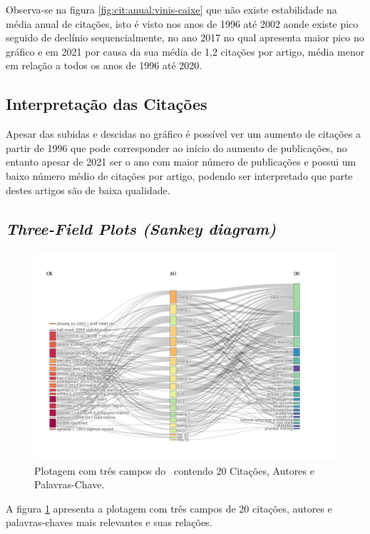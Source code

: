 Observa-se na figura \ref{fig:cit:anual:vinis-caixe} que não existe estabilidade na média anual de citações, isto é visto nos anos de 1996 até 2002 aonde existe pico seguido de declínio sequencialmente, no ano 2017 no qual apresenta maior pico no gráfico e em 2021 por causa da sua média de 1,2 citações por artigo, média menor em relação a todos os anos de 1996 até 2020.

\subsection{Interpretação das Citações}

Apesar das subidas e descidas no gráfico é possível ver um aumento de citações a partir de 1996 que pode corresponder ao início do aumento de publicações, no entanto apesar de 2021 ser o ano com maior número de publicações e possui um baixo número médio de citações por artigo, podendo ser interpretado que parte destes artigos são de baixa qualidade.

\subsection{\textit{Three-Field Plots (Sankey diagram)}}

\begin{figure}
    \centering
    \includegraphics[width=1\textwidth]{experiments/vinis-caixe/PesqBibliogr/MineracaoDados/WoS-20220204/Dataset/ThreeFieldPlot-2022-02-09.png}
    \caption{Plotagem com três campos do \dataset\ contendo 20 Citações, Autores e Palavras-Chave.}
    \label{fig:cit:plot:vinis-caixe}
\end{figure}

A figura \ref{fig:cit:plot:vinis-caixe} apresenta a plotagem com três campos de 20 citações, autores e palavras-chaves mais relevantes e suas relações.